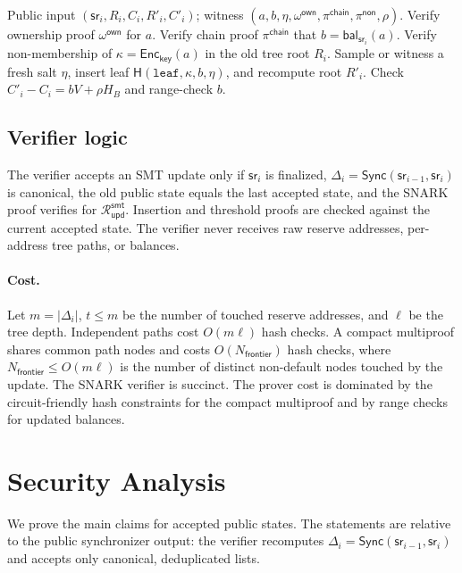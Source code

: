\documentclass[runningheads]{llncs}
\newcommand{\Enc}{\mathsf{Enc}}
\newcommand{\CRH}{\mathsf{H}}
\newcommand{\bal}{\mathsf{bal}}
\newcommand{\sr}{\mathsf{sr}}
\newcommand{\Sync}{\mathsf{Sync}}
\newcommand{\Rel}{\mathcal{R}}
\newcommand{\dlist}{\Delta}
\begin{document}
\begin{algorithm}[t]
\caption{SMT insertion relation \(\Rel_{\mathsf{ins}}^{\mathsf{smt}}\)}
\begin{algorithmic}[1]
\Require Public input \((\sr_i,R_i,C_i,R'_i,C'_i)\); witness \((a,b,\eta,\omega^{\mathsf{own}},\pi^{\mathsf{chain}},\pi^{\mathsf{non}},\rho)\).
\State Verify ownership proof \(\omega^{\mathsf{own}}\) for \(a\).
\State Verify chain proof \(\pi^{\mathsf{chain}}\) that \(b=\bal_{\sr_i}(a)\).
\State Verify non-membership of \(\kappa=\Enc_{\mathsf{key}}(a)\) in the old tree root \(R_i\).
\State Sample or witness a fresh salt \(\eta\), insert leaf \(\CRH(\mathtt{leaf},\kappa,b,\eta)\), and recompute root \(R'_i\).
\State Check \(C'_i-C_i=bV+\rho H_B\) and range-check \(b\).
\end{algorithmic}
\end{algorithm}

\subsection{Verifier logic}

The verifier accepts an SMT update only if \(\sr_i\) is finalized, \(\dlist_i=\Sync(\sr_{i-1},\sr_i)\) is canonical, the old public state equals the last accepted state, and the SNARK proof verifies for \(\Rel_{\mathsf{upd}}^{\mathsf{smt}}\).  Insertion and threshold proofs are checked against the current accepted state.  The verifier never receives raw reserve addresses, per-address tree paths, or balances.

\paragraph{Cost.}
Let \(m=|\dlist_i|\), \(t\le m\) be the number of touched reserve addresses, and \(\ell\) be the tree depth.  Independent paths cost \(O(m\ell)\) hash checks.  A compact multiproof shares common path nodes and costs \(O(N_{\mathsf{frontier}})\) hash checks, where \(N_{\mathsf{frontier}}\le O(m\ell)\) is the number of distinct non-default nodes touched by the update.  The SNARK verifier is succinct.  The prover cost is dominated by the circuit-friendly hash constraints for the compact multiproof and by range checks for updated balances.


\section{Security Analysis}

We prove the main claims for accepted public states.  The statements are relative to the public synchronizer output: the verifier recomputes \(\dlist_i=\Sync(\sr_{i-1},\sr_i)\) and accepts only canonical, deduplicated lists.
\end{document}
